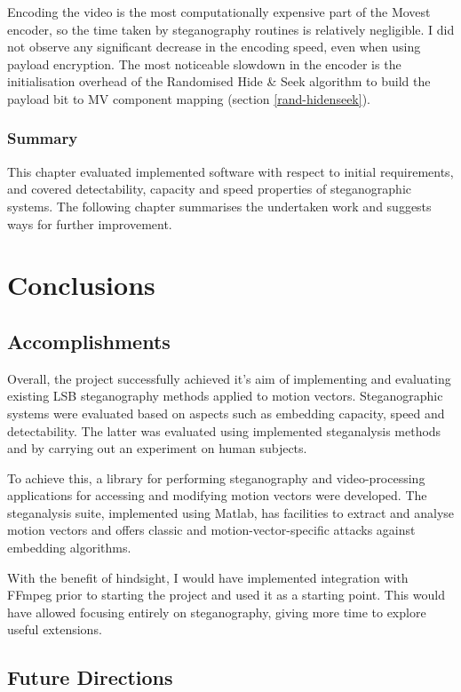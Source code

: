 \documentclass[12pt,british,twoside,notitlepage,usenames,dvipsnames,hypens,final]{report}
\numberwithin{equation}{section}
\numberwithin{figure}{section}
\begin{document}
Encoding the video is the most computationally expensive part of the Movest encoder, so the time taken by steganography routines is relatively negligible. I did not observe any significant decrease in the encoding speed, even when using payload encryption. The most noticeable slowdown in the encoder is the initialisation overhead of the Randomised Hide \& Seek algorithm to build the payload bit to MV component mapping (section \ref{rand-hidenseek}).

\bigskip\bigskip
\subsection*{Summary}
This chapter evaluated implemented software with respect to initial requirements, and covered detectability, capacity and speed properties of steganographic systems. The following chapter summarises the undertaken work and suggests ways for further improvement. 

\cleardoublepage
\chapter{Conclusions}

\section{Accomplishments}

Overall, the project successfully achieved it's aim of implementing and evaluating existing LSB steganography methods applied to motion vectors. Steganographic systems were evaluated based on aspects such as embedding capacity, speed and detectability. The latter was evaluated using implemented steganalysis methods and by carrying out an experiment on human subjects.

To achieve this, a library for performing steganography and video-processing applications for accessing and modifying motion vectors were developed. The steganalysis suite, implemented using Matlab, has facilities to extract and analyse motion vectors and offers classic and motion-vector-specific attacks against embedding algorithms.

With the benefit of hindsight, I would have implemented integration with FFmpeg prior to starting the project and used it as a starting point. This would have allowed focusing entirely on steganography, giving more time to explore useful extensions.

\section{Future Directions}
\end{document}
